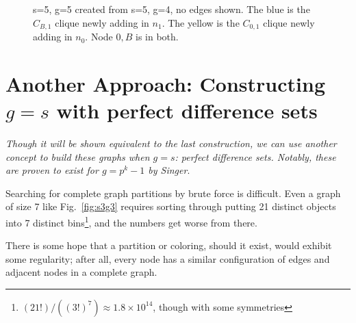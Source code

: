 \documentclass[11pt, oneside]{article} 	%
\begin{document}
\begin{figure}[!htb]
\centering
{}
\caption{s=5, g=5 created from s=5, g=4, no edges shown. The blue is the $C_{B,1}$ clique newly adding in $n_1$. The yellow is the $C_{0,1}$ clique newly adding in $n_0$. Node $0,B$ is in both.}
\label{fig:s5g5}
\end{figure}



\section{Another Approach: Constructing $g=s$ with perfect difference sets}
\emph{Though it will be shown equivalent to the last construction, we can use another concept to build these graphs when $g=s$: perfect difference sets. Notably, these are proven to exist for $g=p^k-1$ by Singer\cite{1}}.

Searching for complete graph partitions by brute force is difficult. Even a graph of size 7 like Fig.~\ref{fig:s3g3} requires sorting through putting 21 distinct objects into 7 distinct bins\footnote{$(21!)/((3!)^7) \approx 1.8 \times 10^{14}$, though with some symmetries}, and the numbers get worse from there. 

There is some hope that a partition or coloring, should it exist, would exhibit some regularity; after all, every node has a similar configuration of edges and adjacent nodes in a complete graph.
\end{document}
